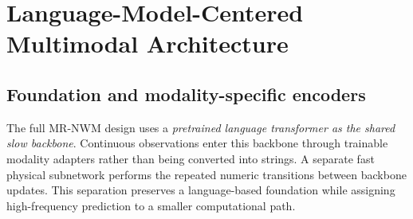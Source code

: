 \section{Language-Model-Centered Multimodal Architecture}
\subsection{Foundation and modality-specific encoders}
The full MR-NWM design uses a \emph{pretrained language transformer as the shared
slow backbone}. Continuous observations enter this backbone through trainable
modality adapters rather than being converted into strings. A separate fast
physical subnetwork performs the repeated numeric transitions between backbone
updates. This separation preserves a language-based foundation while assigning
high-frequency prediction to a smaller computational path.

